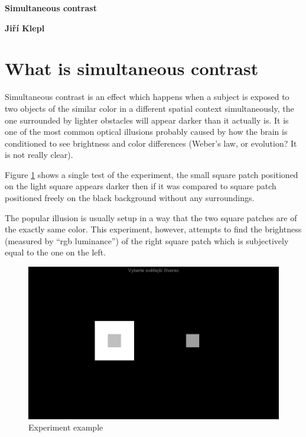 \documentclass[a4paper,12pt]{article} %
\begin{document}
\thispagestyle{empty}

\begin{center}
    {\Large \bf Simultaneous contrast}
    \vspace{2mm}

    {\bf Jiří Klepl}
\end{center}

\section{What is simultaneous contrast}

Simultaneous contrast is an effect which happens when a subject is exposed to two objects of the similar color in a different spatial context simultaneously, the one surrounded by lighter obstacles will appear darker than it actually is. It is one of the most common optical illusions probably caused by how the brain is conditioned to see brightness and color differences (Weber's law, or evolution? It is not really clear).

Figure \ref{experiment_png} shows a single test of the experiment, the small square patch positioned on the light square appears darker then if it was compared to square patch positioned freely on the black background without any surroundings.

The popular illusion is usually setup in a way that the two square patches are of the exactly same color. This experiment, however, attempts to find the brightness (measured by ``rgb luminance'') of the right square patch which is subjectively equal to the one on the left.

\begin{figure}[htb!]
    \centering
    \caption{Experiment example}
    \label{experiment_png}
    \includegraphics[width=\linewidth]{experiment.png}
\end{figure}
\end{document}
